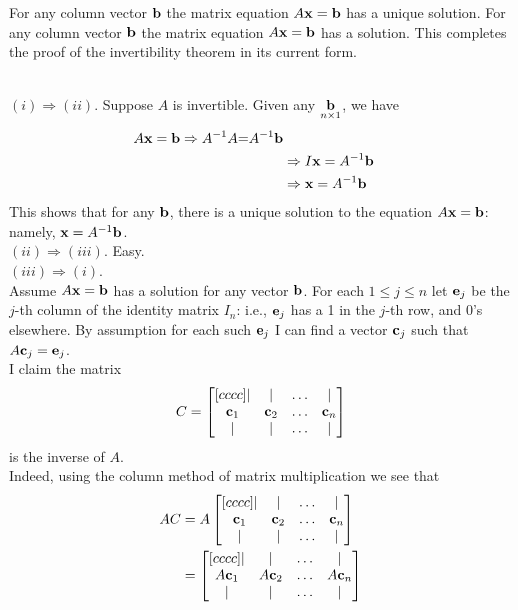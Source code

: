 \ii For any column vector ${\mathbf b}$ the matrix equation $A{\mathbf x}={\mathbf b}$ has a unique solution. 
\ii For any column vector ${\mathbf b}$ the matrix equation $A{\mathbf x}={\mathbf b}$ has a solution.  
\ee
This completes the proof of the invertibility theorem in its current form. 
\\
\begin{solution}
\ \\
$(i)\Rightarrow (ii)$. Suppose $A$ is invertible. Given any $\underset{n\times 1}{{\mathbf b}}$, we have 
\begin{align*}
A{\mathbf x}={\mathbf b}\Rightarrow A^{-1}A\bold=A^{-1}{\mathbf b}\\
&\Rightarrow I{\mathbf x}=A^{-1}{\mathbf b}\\
&\Rightarrow {\mathbf x}=A^{-1}{\mathbf b}
\end{align*}
This shows that for any ${\mathbf b}$, there is a unique solution to the equation $A{\mathbf x}={\mathbf b}$: namely, ${\mathbf x}=A^{-1}{\mathbf b}$. 
\\
$(ii)\Rightarrow (iii)$. Easy. 
\\
$(iii)\Rightarrow (i)$. \\ 
Assume $A{\mathbf x}={\mathbf b}$ has a solution for any vector ${\mathbf b}$. For each $1\leq j\leq n$ let ${\mathbf e}_j$ be the $j$-th column of the identity matrix $I_n$: i.e., ${\mathbf e}_j$ has a 1 in the $j$-th row, and 0's elsewhere. By assumption for each such ${\mathbf e}_j$ I can find a vector ${\mathbf c}_j$ such that $A{\mathbf c}_j={\mathbf e}_j$. 
\\
I claim the matrix  
\[
C=\begin{bmatrix}[cccc]\vert&\vert &\dots &\vert\\ {\mathbf c}_1&{\mathbf c}_2&\dots&{\mathbf c}_n\\\vert&\vert &\dots &\vert \end{bmatrix}\]
is the inverse of $A$. 
\\
Indeed, using the column method of matrix multiplication we see that 
\begin{align*}
AC&=A\begin{bmatrix}[cccc]\vert&\vert &\dots &\vert\\ \boldc_1&\boldc_2&\dots&\boldc_n\\\vert&\vert &\dots &\vert \end{bmatrix} \\
&=\begin{bmatrix}[cccc]\vert&\vert &\dots &\vert\\ A\boldc_1&A\boldc_2&\dots&A\boldc_n\\\vert&\vert &\dots &\vert \end{bmatrix}\\

\end{align*}
\end{solution}
